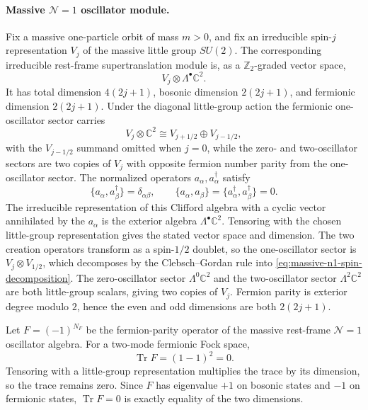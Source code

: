 \paragraph{Massive \(\mathcal N=1\) oscillator module.}
Fix a massive one-particle orbit of mass \(m>0\), and fix an irreducible
spin-\(j\) representation \(V_j\) of the massive little group \(SU(2)\).  The
corresponding irreducible rest-frame supertranslation module is, as a
\(\mathbb Z_2\)-graded vector space,
\[
  V_j\otimes \Lambda^\bullet \mathbb C^2 .
\]
It has total dimension \(4(2j+1)\), bosonic dimension \(2(2j+1)\), and
fermionic dimension \(2(2j+1)\).  Under the diagonal little-group action the
fermionic one-oscillator sector carries
\begin{equation}
  V_j\otimes \mathbb C^2
  \cong
  V_{j+1/2}\oplus V_{j-1/2},
  \label{eq:massive-n1-spin-decomposition}
\end{equation}
with the \(V_{j-1/2}\) summand omitted when \(j=0\), while the zero- and
two-oscillator sectors are two copies of \(V_j\) with opposite fermion
number parity from the one-oscillator sector.
The normalized operators \(a_\alpha,a_\alpha^\dagger\) satisfy
\[
  \{a_\alpha,a_\beta^\dagger\}=\delta_{\alpha\beta},
  \qquad
  \{a_\alpha,a_\beta\}=\{a_\alpha^\dagger,a_\beta^\dagger\}=0 .
\]
The irreducible representation of this Clifford algebra with a cyclic vector
annihilated by the \(a_\alpha\) is the exterior algebra
\(\Lambda^\bullet\mathbb C^2\).  Tensoring with the chosen little-group
representation gives the stated vector space and dimension.  The two
creation operators transform as a spin-\(1/2\) doublet, so the
one-oscillator sector is \(V_j\otimes V_{1/2}\), which decomposes by the
Clebsch--Gordan rule into \eqref{eq:massive-n1-spin-decomposition}.  The
zero-oscillator sector \(\Lambda^0\mathbb C^2\) and the two-oscillator sector
\(\Lambda^2\mathbb C^2\) are both little-group scalars, giving two copies of
\(V_j\).  Fermion parity is exterior degree modulo \(2\), hence the even and
odd dimensions are both \(2(2j+1)\).

\begin{remark}
\label{rem:susy-equal-boson-fermion}
Let \(F=(-1)^{N_F}\) be the fermion-parity operator of the massive rest-frame
\(\mathcal N=1\) oscillator algebra.
For a two-mode fermionic Fock space,
\[
  \operatorname{Tr}F=(1-1)^2=0 .
\]
Tensoring with a little-group representation multiplies the trace by its
dimension, so the trace remains zero.  Since \(F\) has eigenvalue \(+1\) on
bosonic states and \(-1\) on fermionic states, \(\operatorname{Tr}F=0\) is
exactly equality of the two dimensions.
\end{remark}

